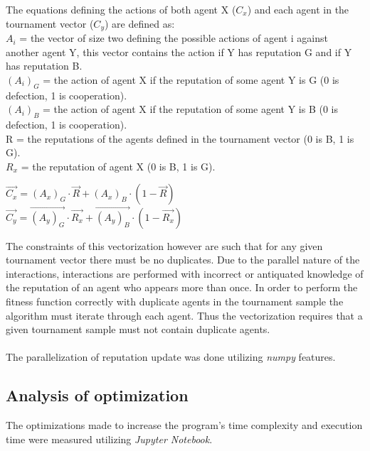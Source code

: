 \documentclass[10pt,a4paper]{article}
\begin{document}
The equations defining the actions of both agent X (\emph{$C_{x}$}) and each agent in the tournament vector (\emph{$C_{y}$}) are defined as:\\
$A_{i}$ = the vector of size two defining the possible actions of agent i against another agent Y, this vector contains the action if Y has reputation G and if Y has reputation B.\\
$(A_{i})_{G}$ = the action of agent X if the reputation of some agent Y is G (0 is defection, 1 is cooperation). \\
$(A_{i})_{B}$ = the action of agent X if the reputation of some agent Y is B (0 is defection, 1 is cooperation). \\
R = the reputations of the agents defined in the tournament vector (0 is B, 1 is G). \\
$R_{x}$ = the reputation of agent X (0 is B, 1 is G). 
\begin{center}
$\overrightarrow{C_{x}} = (A_{x})_{G} \cdot \overrightarrow{R} + (A_{x})_{B} \cdot (1 - \overrightarrow{R})$
\\
$\overrightarrow{C_{y}} = \overrightarrow{(A_{y})_{G}} \cdot \overrightarrow{R_{x}} + \overrightarrow{(A_{y})_{B}} \cdot (1 - \overrightarrow{R_{x}})$
\end{center}

The constraints of this vectorization however are such that for any given tournament vector there must be no duplicates.
Due to the parallel nature of the interactions, interactions are performed with incorrect or antiquated knowledge of the reputation of an agent who appears more than once.
In order to perform the fitness function correctly with duplicate agents in the tournament sample the algorithm must iterate through each agent.
Thus the vectorization requires that a given tournament sample must not contain duplicate agents.
\\\\
The parallelization of reputation update was done utilizing \emph{numpy} features.

\subsection{Analysis of optimization}
The optimizations made to increase the program's time complexity and execution time were measured utilizing \emph{Jupyter Notebook}.

\pagebreak
\end{document}
